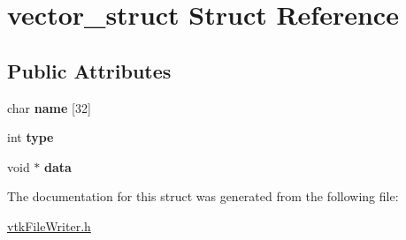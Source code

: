 \hypertarget{structvector__struct}{
\section{vector\_\-struct Struct Reference}
\label{structvector__struct}
}
\subsection*{Public Attributes}
\begin{DoxyCompactItemize}
\item 
\hypertarget{structvector__struct_a5aa05d207c201154c29ba2bc2922b6fb}{
char {\bfseries name} \mbox{[}32\mbox{]}}
\label{structvector__struct_a5aa05d207c201154c29ba2bc2922b6fb}

\item 
\hypertarget{structvector__struct_adf9d01395fcd684d530e8b7108d9a61c}{
int {\bfseries type}}
\label{structvector__struct_adf9d01395fcd684d530e8b7108d9a61c}

\item 
\hypertarget{structvector__struct_aaf147f1b98ed439711a620cf7270287a}{
void $\ast$ {\bfseries data}}
\label{structvector__struct_aaf147f1b98ed439711a620cf7270287a}

\end{DoxyCompactItemize}


The documentation for this struct was generated from the following file:\begin{DoxyCompactItemize}
\item 
\hyperlink{vtkFileWriter_8h}{vtkFileWriter.h}\end{DoxyCompactItemize}
